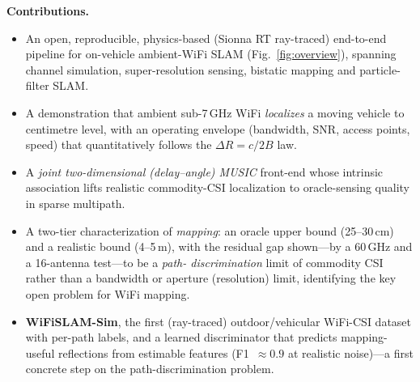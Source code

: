 \documentclass[journal]{IEEEtran}
\newcommand{\SI}[2]{#1\,#2}
\newcommand{\SIrange}[3]{#1--#2\,#3}
\begin{document}
\textbf{Contributions.}
\begin{itemize}
\item An open, reproducible, physics-based (Sionna RT ray-traced) end-to-end
pipeline for on-vehicle ambient-WiFi SLAM (Fig.~\ref{fig:overview}), spanning channel
simulation, super-resolution sensing, bistatic mapping and particle-filter SLAM.
\item A demonstration that ambient sub-\SI{7}{GHz} WiFi \emph{localizes} a moving
vehicle to centimetre level, with an operating envelope (bandwidth, SNR, access
points, speed) that quantitatively follows the $\Delta R=c/2B$ law.
\item A \emph{joint two-dimensional (delay--angle) MUSIC} front-end whose intrinsic
association lifts realistic commodity-CSI localization to oracle-sensing quality
in sparse multipath.
\item A two-tier characterization of \emph{mapping}: an oracle upper bound
(\SIrange{25}{30}{cm}) and a realistic bound (\SIrange{4}{5}{m}), with the residual
gap shown---by a \SI{60}{GHz} and a 16-antenna test---to be a \emph{path-
discrimination} limit of commodity CSI rather than a bandwidth or aperture
(resolution) limit, identifying the key open problem for WiFi mapping.
\item \textbf{WiFiSLAM-Sim}, the first (ray-traced) outdoor/vehicular WiFi-CSI
dataset with per-path labels, and a learned discriminator that predicts
mapping-useful reflections from estimable features (F1~$\approx0.9$ at realistic
noise)---a first concrete step on the path-discrimination problem.
\end{itemize}
\end{document}
